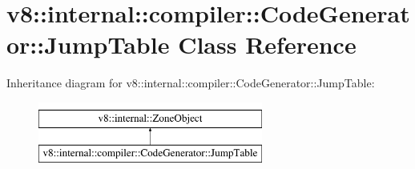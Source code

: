 \hypertarget{classv8_1_1internal_1_1compiler_1_1CodeGenerator_1_1JumpTable}{}\section{v8\+:\+:internal\+:\+:compiler\+:\+:Code\+Generator\+:\+:Jump\+Table Class Reference}
\label{classv8_1_1internal_1_1compiler_1_1CodeGenerator_1_1JumpTable}
Inheritance diagram for v8\+:\+:internal\+:\+:compiler\+:\+:Code\+Generator\+:\+:Jump\+Table\+:\begin{figure}[H]
\begin{center}
\leavevmode
\includegraphics[height=2.000000cm]{classv8_1_1internal_1_1compiler_1_1CodeGenerator_1_1JumpTable}
\end{center}
\end{figure}

